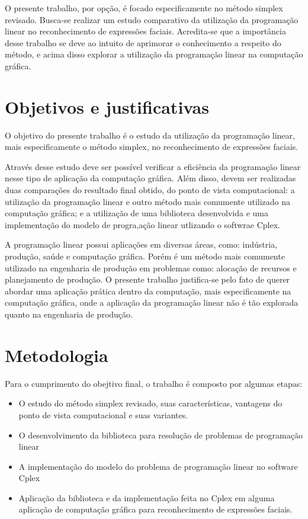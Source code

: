 O presente trabalho, por opção, é focado especificamente no método simplex revisado. Busca-se realizar um estudo comparativo da utilização da programação linear no reconhecimento de expressões faciais. Acredita-se que a importância desse trabalho se deve ao intuito de aprimorar o conhecimento a respeito do método, e acima disso explorar a utilização da programação linear na computação gráfica.

\section{Objetivos e justificativas}
O objetivo do presente trabalho é o estudo da utilização da programação linear, mais especificamente o método simplex, no reconhecimento de expressões faciais. 

Através desse estudo deve ser possível verificar a eficiência da programação linear nesse tipo de aplicação da computação gráfica. Além disso, devem ser realizadas duas comparações do resultado final obtido, do ponto de vista computacional: a utilização da programação linear e outro método mais comumente utilizado na computação gráfica; e a utilização de uma biblioteca desenvolvida e uma implementação do modelo de progra,ação linear utlizando o softwrae Cplex.

A programação linear possui aplicações em diversas áreas, como: indústria, produção, saúde e computação gráfica. Porém é um método mais comumente utilizado na engenharia de produção em problemas como: alocação de recursos e planejamento de produção. O presente trabalho justifica-se pelo fato de querer abordar uma aplicação prática dentro da computação, mais especificamente na computação gráfica, onde a aplicação da programação linear não é tão explorada quanto na engenharia de produção.

\section{Metodologia}
Para o cumprimento do obejtivo final, o trabalho é composto por algumas etapas:

\begin{itemize} 
\item O estudo do método simplex revisado, suas características, vantagens do ponto de vista computacional e suas variantes.
\item O desenvolvimento da biblioteca para resolução de problemas de programação linear
\item A implementação do modelo do problema de programação linear no software Cplex
\item Aplicação da biblioteca e da implementação feita no Cplex em alguma aplicação de computação gráfica para reconhecimento de expressões faciais.
\end{itemize}

